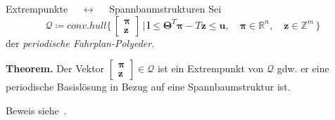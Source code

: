 \documentclass[accentcolor = tud11b, colorbacktitle, landscape, german, presentation, tudmathserif]{tudbeamer}
\newcommand{\R}{\ensuremath{\mathbb{R}}}
\newcommand{\Z}{\ensuremath{\mathbb{Z}}}
\newcommand{\mat}[1]{\boldsymbol{\mathbf{#1}}}
\renewcommand{\vec}[1]{\boldsymbol{\mathbf{#1}}}
\begin{document}
			\begin{frame}{Extrempunkte \(\quad\longleftrightarrow\quad\) Spannbaumstrukturen} %
				Sei
				\begin{equation*}
					\mathcal{Q} \coloneqq \mathit{conv.hull} \Bigg\{\, \begin{bmatrix} \vec{\pi} \\ \vec{z} \end{bmatrix} \,\bigg\vert\, \vec{l} \leq \mat{\Theta}^T \vec{\pi} - T\vec{z} \leq \vec{u}, \quad \vec{\pi} \in \R^n, \quad \vec{z} \in \Z^m \,\Bigg\}
				\end{equation*}
				der \emph{periodische Fahrplan-Polyeder}.
				
				\vspace{1cm}
				\textbf{Theorem.} Der Vektor \( \begin{bmatrix} \vec{\pi} \\ \vec{z} \end{bmatrix} \in \mathcal{Q} \) ist ein Extrempunkt von \( \mathcal{Q} \) gdw. er eine periodische Basislösung in Bezug auf eine Spannbaumstruktur ist.
				
				Beweis siehe~\cite{nachtigallPeriodicNetworkOptimizationi1999}.
			\end{frame}

		
\end{document}

